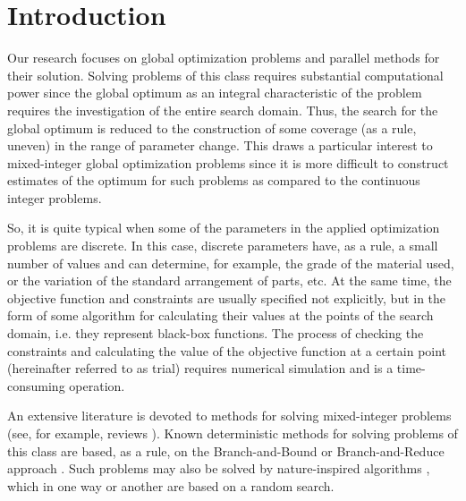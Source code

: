 \documentclass[
11pt,%
tightenlines,%
twoside,%
onecolumn,%
nofloats,%
nobibnotes,%
nofootinbib,%
superscriptaddress,%
noshowpacs,%
centertags]%
{revtex4}
\begin{document}

\maketitle


\section{Introduction}

Our research focuses on global optimization problems and parallel methods for their solution. Solving problems of this class requires substantial computational power since the global optimum as an integral characteristic of the problem requires the investigation of the entire search domain. Thus, the search for the global optimum is reduced to the construction of some coverage (as a rule, uneven) in the range of parameter change. This draws a particular interest to mixed-integer global optimization problems since it is more difficult to construct estimates of the optimum for such problems as compared to the continuous integer problems.

So, it is quite typical when some of the parameters in the applied optimization problems are discrete. In this case, discrete parameters have, as a rule, a small number of values and can determine, for example, the grade of the material used, or the variation of the standard arrangement of parts, etc.
At the same time, the objective function and constraints are usually specified not explicitly, but in the form of some algorithm for calculating their values at the points of the search domain, i.e. they represent black-box functions. The process of checking the constraints and calculating the value of the objective function at a certain point (hereinafter referred to as trial) requires numerical simulation and is a time-consuming operation.

An extensive literature is devoted to methods for solving mixed-integer problems (see, for example, reviews \cite{Burer,Boukouvala}). Known deterministic methods for solving problems of this class are based, as a rule, on the Branch-and-Bound \cite{Belotti} or Branch-and-Reduce approach \cite{Vigerske}. Such problems may also be solved by nature-inspired algorithms \cite{Deep,Schluter}, which in one way or another are based on a random search.
\end{document}
